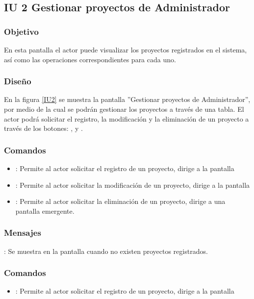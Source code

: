 \subsection{IU 2 Gestionar proyectos de Administrador}

\subsubsection{Objetivo}
	En esta pantalla el actor puede visualizar los proyectos registrados en el sistema, así como las operaciones correspondientes para cada uno.

\subsubsection{Diseño}
	En la figura \ref{IU2} se muestra la pantalla ''Gestionar proyectos de Administrador'', por medio de la cual se podrán gestionar los proyectos a través de una tabla. El actor podrá solicitar el registro, la modificación y la eliminación de un proyecto a través de los botones: , \editar y \eliminar.

\label{IU2}

\subsubsection{Comandos}
\begin{itemize}
	\item {}: Permite al actor solicitar el registro de un proyecto, dirige a la pantalla 
	\item \editar [Modificar]: Permite al actor solicitar la modificación de un proyecto, dirige a la pantalla 
	\item \eliminar [Eliminar]: Permite al actor solicitar la eliminación de un proyecto, dirige a una pantalla emergente.
\end{itemize}

\subsubsection{Mensajes}

\begin{Citemize}
	\item {}: Se muestra en la pantalla  cuando no existen proyectos registrados.
\end{Citemize}

\label{IU2A}
\subsubsection{Comandos}
\begin{itemize}
	\item {}: Permite al actor solicitar el registro de un proyecto, dirige a la pantalla 
\end{itemize}